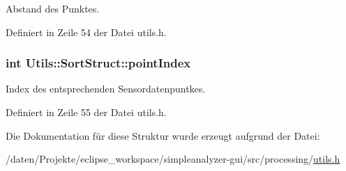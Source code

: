 Abstand des Punktes. 



Definiert in Zeile 54 der Datei utils.\-h.

\hypertarget{structUtils_1_1SortStruct_ad470a3f9a230e66a47fd022bf7a4a70e}{
\subsubsection[{point\-Index}]{\setlength{\rightskip}{0pt plus 5cm}int Utils\-::\-Sort\-Struct\-::point\-Index}}\label{structUtils_1_1SortStruct_ad470a3f9a230e66a47fd022bf7a4a70e}


Index des entsprechenden Sensordatenpuntkes. 



Definiert in Zeile 55 der Datei utils.\-h.



Die Dokumentation für diese Struktur wurde erzeugt aufgrund der Datei\-:\begin{DoxyCompactItemize}
\item 
/daten/\-Projekte/eclipse\-\_\-workspace/simpleanalyzer-\/gui/src/processing/\hyperlink{utils_8h}{utils.\-h}\end{DoxyCompactItemize}
